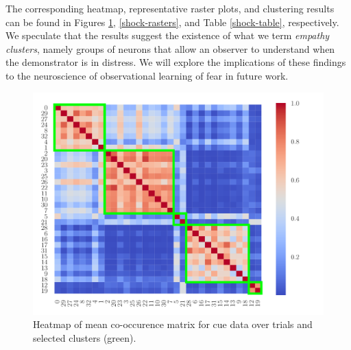 \documentclass[twoside]{article}
\begin{document}
The corresponding heatmap, representative raster plots, and clustering results can be found in Figures \ref{shock-hm}, \ref{shock-rasters}, and Table \ref{shock-table}, respectively. We speculate that the results suggest the existence of what we term \emph{empathy clusters}, namely groups of neurons that allow an observer to understand when the demonstrator is in distress. We will explore the implications of these findings to the neuroscience of observational learning of fear in future work.
\begin{figure}[h]
\begin{center}
\includegraphics[scale=0.33]{../img/shock_mod_cue.pdf}
\end{center}
\caption{Heatmap of mean co-occurence matrix for cue data over trials and selected clusters (green).} 
\label{shock-hm}
\end{figure} 

\end{document}
